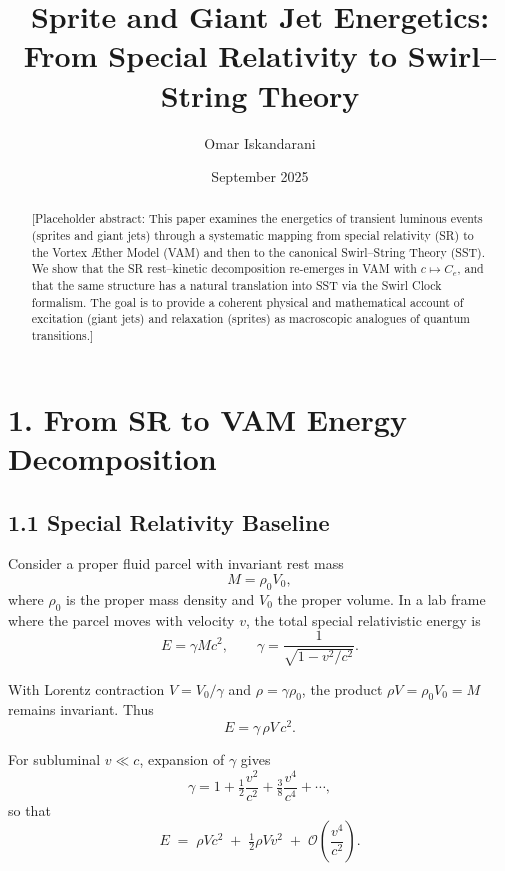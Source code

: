 \documentclass[11pt]{article}
\title{Sprite and Giant Jet Energetics: From Special Relativity to Swirl--String Theory}
\author{Omar Iskandarani}
\date{September 2025}
\newcommand{\Ce}{C_{e}}
\begin{document}
\maketitle

\begin{abstract}
[Placeholder abstract: This paper examines the energetics of transient luminous events (sprites and giant jets) through a systematic mapping from special relativity (SR) to the Vortex \AE ther Model (VAM) and then to the canonical Swirl--String Theory (SST). We show that the SR rest--kinetic decomposition re-emerges in VAM with $c \mapsto \Ce$, and that the same structure has a natural translation into SST via the Swirl Clock formalism. The goal is to provide a coherent physical and mathematical account of excitation (giant jets) and relaxation (sprites) as macroscopic analogues of quantum transitions.]
\end{abstract}

\section*{1. From SR to VAM Energy Decomposition}

    \subsection*{1.1 Special Relativity Baseline}

        Consider a proper fluid parcel with invariant rest mass
        \[
            M = \rho_0 V_0 ,
        \]
        where $\rho_0$ is the proper mass density and $V_0$ the proper volume.
        In a lab frame where the parcel moves with velocity $v$, the total
        special relativistic energy is
        \begin{equation}
        E = \gamma M c^2,
        \qquad
        \gamma = \frac{1}{\sqrt{1 - v^2/c^2}}.
        \label{eq:SRtotal}
        \end{equation}

        With Lorentz contraction $V = V_0/\gamma$ and $\rho = \gamma \rho_0$,
        the product $\rho V = \rho_0 V_0 = M$ remains invariant. Thus
        \begin{equation}
        E = \gamma\, \rho V\, c^2.
        \label{eq:SRrho}
        \end{equation}

        For subluminal $v \ll c$, expansion of $\gamma$ gives
        \[
            \gamma = 1 + \tfrac{1}{2}\frac{v^2}{c^2}
            + \tfrac{3}{8}\frac{v^4}{c^4} + \cdots,
        \]
        so that
        \begin{equation}
        E \;=\; \rho V c^2
        \;+\; \tfrac{1}{2}\rho V v^2
        \;+\; \mathcal{O}\!\left(\frac{v^4}{c^2}\right).
        \label{eq:SRsplit}
        \end{equation}
\end{document}
